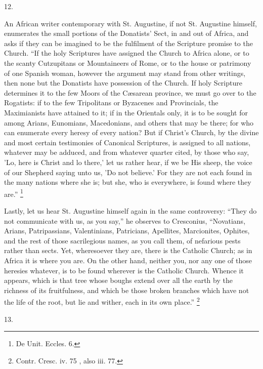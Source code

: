 12.

An African writer contemporary with St. Augustine, if
not St. Augustine himself, enumerates the small portions
of the Donatists' Sect, in and out of Africa, and asks if
they can be imagined to be the fulfilment of the
Scripture promise to the Church. ``If the holy
Scriptures have assigned the Church to Africa alone, or
to the scanty Cutzupitans or Mountaineers of Rome, or to
the house or patrimony of one Spanish woman, however the
argument may stand from other writings, then none but the
Donatists have possession of the Church. If holy
Scripture determines it to the few Moors of the Cæsarean
province, we must go over to the Rogatists: if to the few
Tripolitans or Byzacenes and Provincials, the
Maximianists have attained to it; if in the Orientals
only, it is to be sought for among Arians, Eunomians,
Macedonians, and others that may be there; for who can
enumerate every heresy of every nation? But if Christ's
Church, by the divine and most certain testimonies of
Canonical Scriptures, is assigned to all nations,
whatever may be adduced, and from whatever quarter cited,
by those who say, 'Lo, here is Christ and lo there,' let
us rather hear, if we be His sheep, the voice of our
Shepherd saying unto us, 'Do not believe.' For they are
not each found in the many nations where she is; but she,
who is everywhere, is found where they are.'' \footnote{De Unit. Eccles. 6.}

Lastly, let us hear St. Augustine himself again in the
same controversy: ``They do not communicate with us,
as you say,'' he observes to Cresconius,
``Novatians, Arians, Patripassians, Valentinians,
Patricians, Apellites, Marcionites, Ophites, and the rest
of those sacrilegious names, as you call them, of
nefarious pests rather than sects. Yet, wheresoever they
are, there is the Catholic Church; as in Africa it is
where you are. On the other hand, neither you, nor any
one of those heresies whatever, is to be found wherever
is the Catholic Church. Whence it appears, which is that
tree whose boughs extend over all the earth by the
richness of its fruitfulness, and which be those broken
branches which have not the life of the root, but lie and
wither, each in its own place.'' \footnote{Contr. Cresc. iv. 75 , also
iii. 77.}

13.

